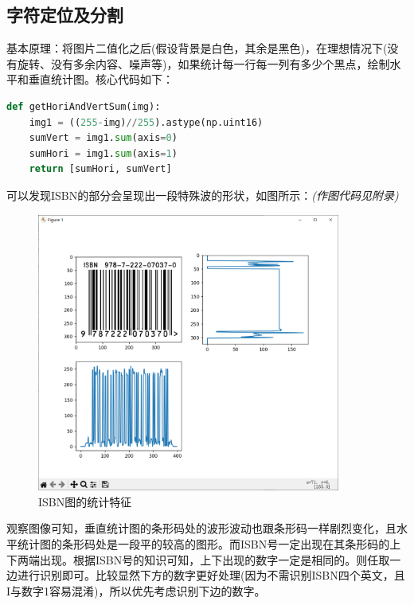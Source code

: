 \documentclass{ctexart}
\begin{document}
\subsection{字符定位及分割}
基本原理：将图片二值化之后(假设背景是白色，其余是黑色)，在理想情况下(没有旋转、没有多余内容、噪声等)，如果统计每一行每一列有多少个黑点，绘制水平和垂直统计图。核心代码如下：
\begin{lstlisting}[language=python]
def getHoriAndVertSum(img):
    img1 = ((255-img)//255).astype(np.uint16)
    sumVert = img1.sum(axis=0)
    sumHori = img1.sum(axis=1)
    return [sumHori, sumVert]
\end{lstlisting}
可以发现ISBN的部分会呈现出一段特殊波的形状，如图所示：\textit{(作图代码见附录)}
\begin{figure}[H]%
    \centering
    \includegraphics[height=260pt]{isbn_sum}
    \caption{ISBN图的统计特征}
\end{figure}

观察图像可知，垂直统计图的条形码处的波形波动也跟条形码一样剧烈变化，且水平统计图的条形码处是一段平的较高的图形。而ISBN号一定出现在其条形码的上下两端出现。根据ISBN号的知识可知，上下出现的数字一定是相同的。则任取一边进行识别即可。比较显然下方的数字更好处理(因为不需识别ISBN四个英文，且I与数字1容易混淆)，所以优先考虑识别下边的数字。

\end{document}
